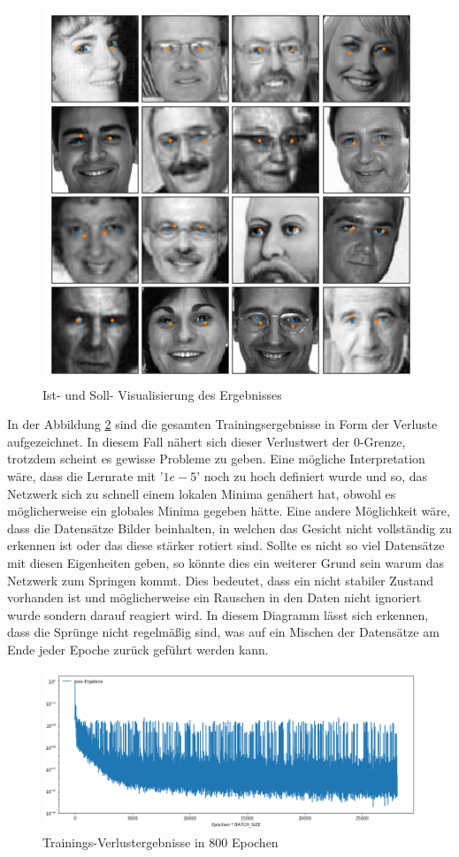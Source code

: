 \begin{figure}
	\centering
	\includegraphics[scale=0.5]{images/epoch-800-full.png}
	\caption{Ist- und Soll- Visualisierung des Ergebnisses}
	\label{fig:resultPic}
\end{figure}
In der Abbildung \ref{fig:lossDiag} sind die gesamten Trainingsergebnisse in Form der Verluste aufgezeichnet. 
In diesem Fall nähert sich dieser Verlustwert der $0$-Grenze, trotzdem scheint es gewisse Probleme zu geben. 
Eine mögliche Interpretation wäre, dass die Lernrate mit '$1e-5$' noch zu hoch definiert wurde und so, das Netzwerk sich zu schnell einem lokalen Minima genähert hat, obwohl es möglicherweise ein globales Minima gegeben hätte. 
Eine andere Möglichkeit wäre, dass die Datensätze Bilder beinhalten, in welchen das Gesicht nicht vollständig zu erkennen ist oder das diese stärker rotiert sind. 
Sollte es nicht so viel Datensätze mit diesen Eigenheiten geben, so könnte dies ein weiterer Grund sein warum das Netzwerk zum Springen kommt. 
Dies bedeutet, dass ein nicht stabiler Zustand vorhanden ist und möglicherweise ein Rauschen in den Daten nicht ignoriert wurde sondern darauf reagiert wird.
In diesem Diagramm lässt sich erkennen, dass die Sprünge nicht regelmäßig sind, was auf ein Mischen der Datensätze am Ende jeder Epoche zurück geführt werden kann. 
\begin{figure}
	\centering
	\includegraphics[scale=0.4]{images/loss-diagram-all.png}
	\caption{Trainings-Verlustergebnisse in 800 Epochen}
	\label{fig:lossDiag}
\end{figure}

